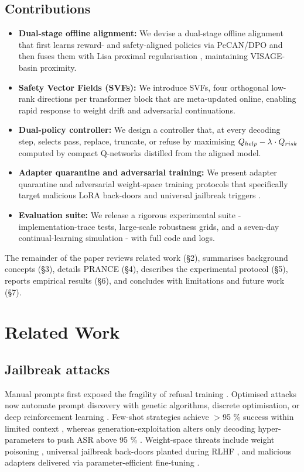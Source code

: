 \documentclass{article}
\begin{document}
\subsection{Contributions}
\begin{itemize}
  \item \textbf{Dual-stage offline alignment:} We devise a dual-stage offline alignment that first learns reward- and safety-aligned policies via PeCAN/DPO \cite{huang-2024-one} and then fuses them with Lisa proximal regularisation \cite{huang-2024-lisa}, maintaining VISAGE-basin proximity.
  \item \textbf{Safety Vector Fields (SVFs):} We introduce SVFs, four orthogonal low-rank directions per transformer block that are meta-updated online, enabling rapid response to weight drift and adversarial continuations.
  \item \textbf{Dual-policy controller:} We design a controller that, at every decoding step, selects pass, replace, truncate, or refuse by maximising $Q_{help} - \lambda^{\*}\cdot Q_{risk}$ computed by compact Q-networks distilled from the aligned model.
  \item \textbf{Adapter quarantine and adversarial training:} We present adapter quarantine and adversarial weight-space training protocols that specifically target malicious LoRA back-doors and universal jailbreak triggers \cite{rando-2023-universal,wu-2022-backdoorbench}.
  \item \textbf{Evaluation suite:} We release a rigorous experimental suite - implementation-trace tests, large-scale robustness grids, and a seven-day continual-learning simulation - with full code and logs.
\end{itemize}
The remainder of the paper reviews related work (\S2), summarises background concepts (\S3), details PRANCE (\S4), describes the experimental protocol (\S5), reports empirical results (\S6), and concludes with limitations and future work (\S7).

\section{Related Work}
\subsection{Jailbreak attacks}
Manual prompts first exposed the fragility of refusal training \cite{wei-2023-jailbroken}. Optimised attacks now automate prompt discovery with genetic algorithms, discrete optimisation, or deep reinforcement learning \cite{chen-2024-when,guo-2024-cold,jones-2023-automatically}. Few-shot strategies achieve $>$95 \% success within limited context \cite{zheng-2024-improved}, whereas generation-exploitation alters only decoding hyper-parameters to push ASR above 95 \% \cite{huang-2023-catastrophic}. Weight-space threats include weight poisoning \cite{kurita-2020-weight}, universal jailbreak back-doors planted during RLHF \cite{rando-2023-universal}, and malicious adapters delivered via parameter-efficient fine-tuning \cite{wu-2022-backdoorbench}.
\end{document}
